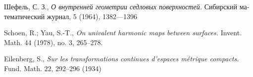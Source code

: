 \documentclass{article}
\begin{document}
\begin{thebibliography}{52}
\begin{otherlanguage}{russian}
Шефель, С. З., 
\textit{О внутренней геометрии седловых поверхностей.}
Сибирский математический журнал, 5 (1964), 1382---1396
\end{otherlanguage}

 Schoen, R.; Yau, S.-T.,
\textit{On univalent harmonic maps between surfaces.}
Invent. Math. 44 (1978), no. 3, 265--278. 

 Eilenberg, S.,
\textit{Sur les transformations continues d’espaces m\'{e}trique compacts.}
Fund. Math. 22, 292--296 (1934)

\end{thebibliography}

\Addresses
\end{document}
